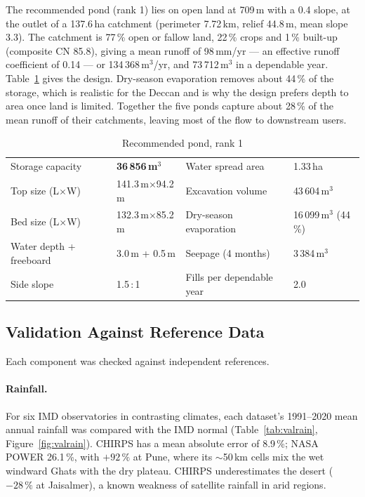 \documentclass[manuscript,screen,review]{acmart}
\begin{document}
The recommended pond (rank 1) lies on open land at 709\,m with a 0.4\textdegree{} slope, at the
outlet of a 137.6\,ha catchment (perimeter 7.72\,km, relief 44.8\,m, mean slope
3.3\textdegree). The catchment is 77\,\% open or fallow land, 22\,\% crops and 1\,\% built-up
(composite CN 85.8), giving a mean runoff of 98\,mm/yr --- an effective runoff coefficient of
0.14 --- or 134\,368\,m$^3$/yr, and 73\,712\,m$^3$ in a dependable year. Table~\ref{tab:design}
gives the design. Dry-season evaporation removes about 44\,\% of the storage, which is
realistic for the Deccan and is why the design prefers depth to area once land is limited.
Together the five ponds capture about 28\,\% of the mean runoff of their catchments, leaving
most of the flow to downstream users.

\begin{table}[h]
  \caption{Recommended pond, rank 1}
  \label{tab:design}
  \small
  \begin{tabular}{@{}ll@{\hspace{2.5em}}ll@{}}
    \toprule
    Storage capacity & \textbf{36\,856\,m$^3$} & Water spread area & 1.33\,ha \\
    Top size (L$\times$W) & 141.3\,m$\times$94.2\,m & Excavation volume & 43\,604\,m$^3$ \\
    Bed size (L$\times$W) & 132.3\,m$\times$85.2\,m & Dry-season evaporation & 16\,099\,m$^3$ (44\,\%) \\
    Water depth + freeboard & 3.0\,m + 0.5\,m & Seepage (4 months) & 3\,384\,m$^3$ \\
    Side slope & 1.5\,:\,1 & Fills per dependable year & 2.0 \\
    \bottomrule
  \end{tabular}
\end{table}

\subsection{Validation Against Reference Data}
Each component was checked against independent references.

\paragraph{Rainfall.} For six IMD observatories in contrasting climates, each dataset's
1991--2020 mean annual rainfall was compared with the IMD normal (Table~\ref{tab:valrain},
Figure~\ref{fig:valrain}). CHIRPS has a mean absolute error of 8.9\,\%; NASA POWER 26.1\,\%,
with $+92\,\%$ at Pune, where its $\sim$50\,km cells mix the wet windward Ghats with the dry
plateau. CHIRPS underestimates the desert ($-28\,\%$ at Jaisalmer), a known weakness of
satellite rainfall in arid regions.
\end{document}
